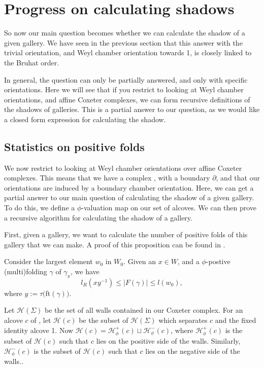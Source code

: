 \documentclass[11pt]{article}
\begin{document}
\section{Progress on calculating shadows}\label{9}

So now our main question becomes whether we can calculate the shadow of a given gallery. We have seen in the previous section that this answer with the trivial orientation, and Weyl chamber orientation towards 1, is closely linked to the Bruhat order. 

In general, the question can only be partially answered, and only with specific orientations. Here we will see that if you restrict to looking at Weyl chamber orientations, and affine Coxeter complexes, we can form recursive definitions of the shadows of galleries. This is a partial answer to our question, as we would like a closed form expression for calculating the shadow. 

\subsection{Statistics on positive folds}

We now restrict to looking at Weyl chamber orientations over affine Coxeter complexes. This means that we have a complex \sg, with a boundary $\partial$\sg, and that our orientations are induced by a boundary chamber orientation. Here, we can get a partial answer to our main question of calculating the shadow of a given gallery. To do this, we define a $\phi$-valuation map on our set of alcoves. We can then prove a recursive algorithm for calculating the shadow of a gallery.

First, given a gallery, we want to calculate the number of positive folds of this gallery that we can make. A proof of this proposition can be found in \cite{DEL}.

\begin{proposition}
    Consider the largest element $w_0$ in $W_0$. Given an $x\in W$, and a $\phi$-postive (multi)folding $\gamma$ of $\gamma_x$, we have
    \[l_R(xy^{-1})\leq \mid F(\gamma)\mid \leq l(w_0),\]
    where $y:=\tau($ft$(\gamma))$.
\end{proposition}


\begin{definition}
    Let $\mathcal{H}(\Sigma)$ be the set of all walls contained in our Coxeter complex. For an alcove $c$ of \sg, let $\mathcal{H}(c)$ be the subset of $\mathcal{H}(\Sigma)$ which separates $c$ and the fixed identity alcove 1. Now $\mathcal{H}(c)=\mathcal{H}_{\phi}^+(c)\sqcup \mathcal{H}_{\phi}^-(c)$, where $\mathcal{H}_{\phi}^+(c)$ is the subset of $\mathcal{H}(c)$ such that $c$ lies on the positive side of the walls. Similarly, $\mathcal{H}_{\phi}^-(c)$ is the subset of $\mathcal{H}(c)$ such that $c$ lies on the negative side of the walls..
\end{definition}
\end{document}
